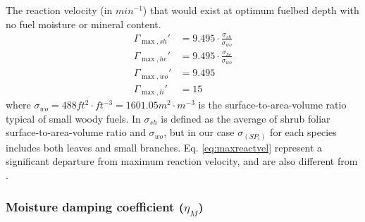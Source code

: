\documentclass[]{book}
\begin{document}
The reaction velocity (in \(min^{-1}\)) that would exist at optimum fuelbed depth with no fuel moisture or mineral content.
\begin{eqnarray}
\Gamma_{\max, sh}' &= 9.495 \cdot \frac{\sigma_{sh}}{\sigma_{wo}}\\
\Gamma_{\max, he}' &= 9.495 \cdot \frac{\sigma_{he}}{\sigma_{wo}}\\
\Gamma_{\max, wo}' &= 9.495 \\
\Gamma_{\max, li}' &= 15 
\label{eq:maxreactvel}
\end{eqnarray}
where \(\sigma_{wo} = 488 ft^2\cdot ft^{-3} = 1601.05 m^2\cdot m^{-3}\) is the surface-to-area-volume ratio typical of small woody fuels. In \citet{Prichard2013} \(\sigma_{sh}\) is defined as the average of shrub foliar surface-to-area-volume ratio and \(\sigma_{wo}\), but in our case \(\sigma_(SP_i)\) for each species includes both leaves and small branches. Eq. \eqref{eq:maxreactvel} represent a significant departure from \citet{Rothermel1972} maximum reaction velocity, and are also different from \citet{Sandberg2007}.

\hypertarget{moisture-damping-coefficient-eta_m}{%
\subsubsection{\texorpdfstring{Moisture damping coefficient (\(\eta_M\))}{Moisture damping coefficient (\textbackslash{}eta\_M)}}\label{moisture-damping-coefficient-eta_m}}
\end{document}
